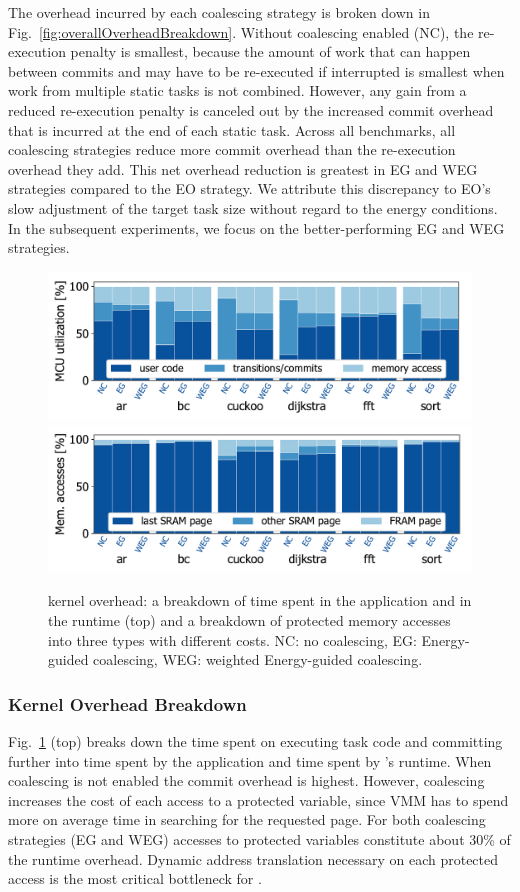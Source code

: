 The overhead incurred by each coalescing strategy is broken down in
Fig.~\ref{fig:overallOverheadBreakdown}. Without coalescing enabled (NC), the
re-execution penalty is smallest, because the amount of work that can happen
between commits and may have to be re-executed if interrupted is smallest when
work from multiple static tasks is not combined.
%
However, any gain from a reduced re-execution penalty is canceled out by
the increased commit overhead that is incurred at the end of each static
task.
%
Across all benchmarks, all coalescing strategies reduce more commit overhead
than the re-execution overhead they add.
%
This net overhead reduction is greatest in EG and WEG strategies compared
to the EO strategy. We attribute this discrepancy to EO's slow adjustment
of the target task size without regard to the energy conditions.
%
In the subsequent experiments, we focus on the better-performing EG and WEG
strategies.
%
\begin{figure}
	\centering
	\includegraphics[width=\columnwidth]{figures/overallOverhead}
	\includegraphics[width=\columnwidth]{figures/memAccess}
	\caption{\sys kernel overhead: a breakdown of time spent in
the application and in the runtime (top) and a breakdown of protected memory
accesses into three types with different costs. NC: no coalescing, EG:
Energy-guided coalescing, WEG: weighted Energy-guided coalescing.}
	\label{fig:coalEfficiency}
\end{figure}
%
\subsubsection{\sys Kernel Overhead Breakdown}
%
Fig.~\ref{fig:coalEfficiency} (top) breaks down the time spent on executing 
task code and committing further into time spent by the application and
time spent by \sys's runtime. When coalescing is not enabled the commit overhead is 
highest.
%
However, coalescing increases the cost of each access to a protected variable,
since VMM has to spend more on average time in searching for the requested page.
%
For both coalescing strategies (EG and WEG) accesses to protected variables
constitute about 30\% of the runtime overhead. Dynamic address translation
necessary on each protected access is the most critical bottleneck for \sys.
%
